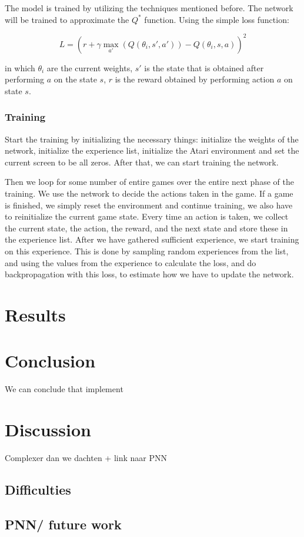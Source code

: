 \documentclass{article}
\begin{document}
The model is trained by utilizing the techniques mentioned before. The network will be trained to approximate the $Q^*$ function. Using the simple loss function:

\[
	L = \left(r + \gamma \max_{a'}( Q(\theta_i, s',a')) - Q(\theta_i, s, a)\right)^2
\]

in which $\theta_i$ are the current weights, $s'$ is the state that is obtained after performing $a$ on the state $s$, $r$ is the reward obtained by performing action $a$ on state $s$.


\subsubsection{Training}
Start the training by initializing the necessary things: initialize the weights of the network, initialize the experience list, initialize the Atari environment and set the current screen to be all zeros. After that, we can start training the network. 

Then we loop for some number of entire games over the entire next phase of the training. We use the network to decide the actions taken in the game. If a game is finished, we simply reset the environment and continue training, we also have to reinitialize the current game state. Every time an action is taken, we collect the current state, the action, the reward, and the next state and store these in the experience list. After we have gathered sufficient experience, we start training on this experience. This is done by sampling random experiences from the list, and using the values from the experience to calculate the loss, and do backpropagation with this loss, to estimate how we have to update the network. 





%




\section{Results}


\section{Conclusion}

We can conclude that implement

\section{Discussion}
Complexer dan we dachten + link naar PNN
\subsection{Difficulties}
\subsection{PNN/ future work}
\cite{*}


\end{document}

